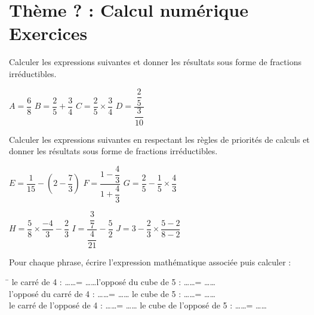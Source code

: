 \documentclass[french,12pt]{report}
\begin{document}
\ReglePied





\chapter{Thème ? : Calcul numérique \\ \Large Exercices }
\thispagestyle{garde}


\bigskip

\begin{Exercice}
Calculer les expressions suivantes et donner les résultats sous forme de fractions irréductibles.\bigskip

$A=\dfrac{6}{8}$\hfill
$B=\dfrac{2}{5}+\dfrac{3}{4}$\hfill
$C=\dfrac{2}{5}\times\dfrac{3}{4}$\hfill
$D=\dfrac{\dfrac{2}{5}}{\dfrac{3}{10}}$\hfill\bigskip

\end{Exercice}


\medskip
\begin{Exercice}

Calculer les expressions suivantes en respectant les règles de priorités de calculs et donner les résultats sous forme de fractions irréductibles.\bigskip

$E=\dfrac{1}{15}-\left( 2-\dfrac{7}{3}\right) $\hfill
$F=\dfrac{1-\dfrac{4}{3}}{1+\dfrac{4}{3}}$\hfill
$G=\dfrac{2}{5}-\dfrac{1}{5}\times\dfrac{4}{3}$\hfill\bigskip

$H=\dfrac{5}{8}\times\dfrac{-4}{3}-\dfrac{2}{3}$\hfill
$I=\dfrac{\dfrac{3}{7}}{\dfrac{4}{21}}-\dfrac{5}{2}$\hfill
$J=3-\dfrac{2}{3}\times\dfrac{5-2}{8-2}$\hfill\bigskip

\end{Exercice}

\begin{Exercice}
Pour chaque phrase, écrire l'expression mathématique associée puis calculer : \par 
\begin{tabbing}
\hspace{10cm}\=\kill
le carré de 4 : \ldots \ldots  = \ldots \ldots   \>l'opposé du cube de 5 : \ldots \ldots  = \ldots \ldots  \\ 
l'opposé du carré de 4 :  \ldots \ldots  = \ldots \ldots \> le cube de 5 :	\ldots \ldots  = \ldots \ldots \\
le carré de l'opposé de 4 :  \ldots \ldots  = \ldots \ldots \> le cube de l'opposé de 5 : 	 \ldots \ldots  = \ldots \ldots
\end{tabbing} 

\end{Exercice}
\medskip
\end{document}
